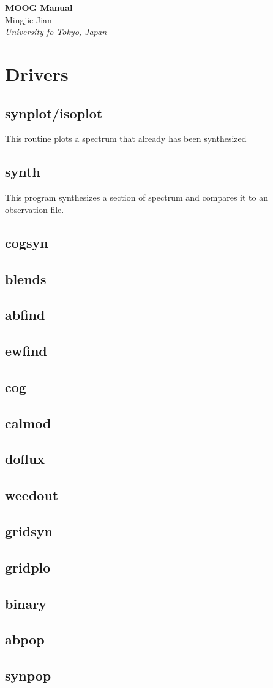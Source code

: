 \documentclass[a4paper,12pt]{article}
\begin{document}
\pagestyle{empty}
\begin{center}
\baselineskip=20pt
{\bf \Large MOOG Manual}\\
\vspace{1pc}
{\large 
Mingjie Jian
}
\\
\vspace{.5pc}
{\sl 
University fo Tokyo, Japan}
\end{center}

\section{Drivers}

\subsection{synplot/isoplot}
This routine plots a spectrum that already has been synthesized
\subsection{synth}
This program synthesizes a section of spectrum and compares it to an observation file.
\subsection{cogsyn}
\subsection{blends}
\subsection{abfind}
\subsection{ewfind}
\subsection{cog}
\subsection{calmod}
\subsection{doflux}
\subsection{weedout}
\subsection{gridsyn}
\subsection{gridplo}
\subsection{binary}
\subsection{abpop}
\subsection{synpop}
\end{document}
